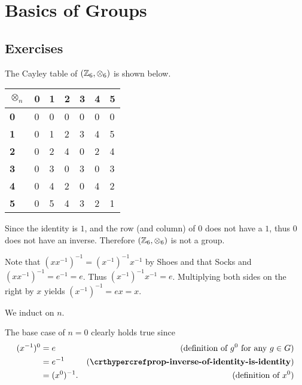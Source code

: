 \section{Basics of Groups}
\subsection*{Exercises}
\begin{questions}
    \item The Cayley table of $(\mathbb{Z}_6, \otimes_6)$ is shown below.
    \begin{table}[H]
        \centering
        \begin{tabular}{|l|l|l|l|l|l|l|}
        \hline
        \textbf{$\otimes_n$} & \textbf{0} & \textbf{1} & \textbf{2} & \textbf{3} & \textbf{4} & \textbf{5} \\ \hline
        \textbf{0} & 0 & 0 & 0 & 0 & 0 & 0 \\ \hline
        \textbf{1} & 0 & 1 & 2 & 3 & 4 & 5 \\ \hline
        \textbf{2} & 0 & 2 & 4 & 0 & 2 & 4 \\ \hline
        \textbf{3} & 0 & 3 & 0 & 3 & 0 & 3 \\ \hline
        \textbf{4} & 0 & 4 & 2 & 0 & 4 & 2 \\ \hline
        \textbf{5} & 0 & 5 & 4 & 3 & 2 & 1 \\ \hline
        \end{tabular}
    \end{table}

    Since the identity is $1$, and the row (and column) of 0 does not have a $1$, thus $0$ does not have an inverse. Therefore $(\mathbb{Z}_6, \otimes_6)$ is not a group.

    \item Note that $(xx^{-1})^{-1} = (x^{-1})^{-1}x^{-1}$ by Shoes and that Socks and $(xx^{-1})^{-1} = e^{-1} = e$. Thus $(x^{-1})^{-1}x^{-1} = e$. Multiplying both sides on the right by $x$ yields $(x^{-1})^{-1} = ex = x$.

    \item We induct on $n$.

    The base case of $n = 0$ clearly holds true since
    \begin{align*}
        (x^{-1})^0 &= e & (\text{definition of }g^0 \text{ for any }g\in G)\\
        &= e^{-1} & (\myref{prop-inverse-of-identity-is-identity})\\
        &= (x^0)^{-1}. & (\text{definition of }x^0)
    \end{align*}


\end{questions}
